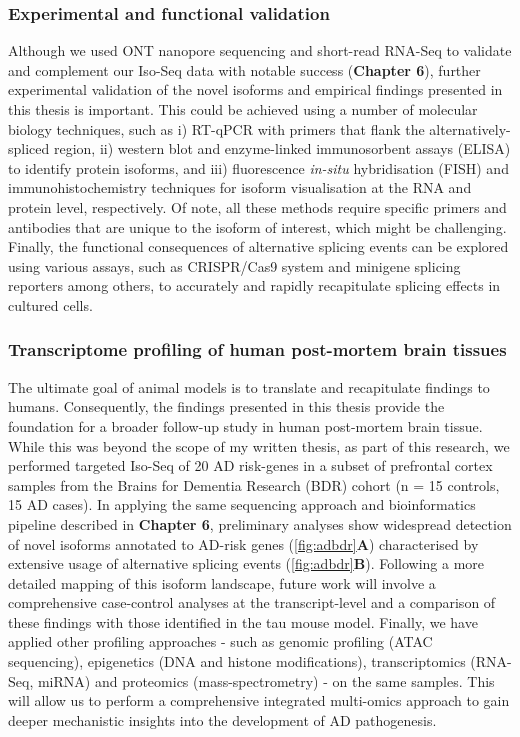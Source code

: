 \subsubsection{Experimental and functional validation}
Although we used ONT nanopore sequencing and short-read RNA-Seq to validate and complement our Iso-Seq data with notable success (\textbf{Chapter 6}), further experimental validation of the novel isoforms and empirical findings presented in this thesis is important. This could be achieved using a number of molecular biology techniques, such as i) RT-qPCR with primers that flank the alternatively-spliced region, ii) western blot and enzyme-linked immunosorbent assays (ELISA) to identify protein isoforms, and iii) fluorescence \textit{in-situ} hybridisation (FISH) and immunohistochemistry techniques for isoform visualisation at the RNA and protein level, respectively. Of note, all these methods require specific primers and antibodies that are unique to the isoform of interest, which might be challenging. Finally, the functional consequences of alternative splicing events can be explored using various assays, such as CRISPR/Cas9 system and minigene splicing reporters among others, to accurately and rapidly recapitulate splicing effects in cultured cells.  


\subsubsection{Transcriptome profiling of human post-mortem brain tissues}  
The ultimate goal of animal models is to translate and recapitulate findings to humans. Consequently, the findings presented in this thesis provide the foundation for a broader follow-up study in human post-mortem brain tissue. While this was beyond the scope of my written thesis, as part of this research, we performed targeted Iso-Seq of 20 AD risk-genes in a subset of prefrontal cortex samples from the Brains for Dementia Research (BDR) cohort (n = 15 controls, 15 AD cases). In applying the same sequencing approach and bioinformatics pipeline described in \textbf{Chapter 6}, preliminary analyses show widespread detection of novel isoforms annotated to AD-risk genes (\cref{fig:adbdr}\textbf{A}) characterised by extensive usage of alternative splicing events (\cref{fig:adbdr}\textbf{B}). Following a more detailed mapping of this isoform landscape, future work will involve a comprehensive case-control analyses at the transcript-level and a comparison of these findings with those identified in the tau mouse model. Finally, we have applied other profiling approaches - such as genomic profiling (ATAC sequencing), epigenetics (DNA and histone modifications), transcriptomics (RNA-Seq, miRNA) and proteomics (mass-spectrometry) - on the same samples. This will allow us to perform a comprehensive integrated multi-omics approach to gain deeper mechanistic insights into the development of AD pathogenesis.     

